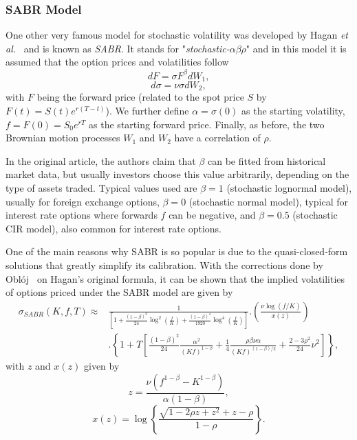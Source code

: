 \subsubsection{SABR Model}
One other very famous model for stochastic volatility was developed by Hagan \textit{et al.}~\cite{Hagan} and is known as \emph{SABR}. It stands for "\emph{stochastic-}$\alpha\beta\rho$" and in this model it is assumed that the option prices and volatilities follow
\begin{equation}\label{dF}
dF=\sigma F^\beta dW_1,
\end{equation}
\begin{equation}\label{dsigma}
d\sigma=\nu\sigma dW_2,
\end{equation}
\noindent with $F$ being the forward price (related to the spot price $S$ by $F(t)=S(t)e^{r(T-t)}$).
We further define $\alpha=\sigma(0)$ as the starting volatility, $f=F(0)=S_0e^{rT}$ as the starting forward price. Finally, as before, the two Brownian motion processes $W_1$ and $W_2$ have a correlation of $\rho$.

\iffalse
It should be noted that we are now using the \hl{forward measure}, so in eq.\eqref{dF} we use $F$, the \emph{forward price}, instead of the usual spot price $S$ from eq.  \ref{GBM}. These two quantities are related by $S(t)=e^{-r(T-t)}F(t)$, so we can easily obtain one from the other.
\fi


In the original article, the authors claim that $\beta$ can be fitted from historical market data, but usually investors choose this value arbitrarily, depending on the type of assets traded. Typical values used are $\beta=1$ (stochastic lognormal model), usually for foreign exchange options, $\beta=0$ (stochastic normal model), typical for interest rate options where forwards $f$ can be negative, and $\beta=0.5$ (stochastic CIR model), also common for interest rate options.

One of the main reasons why SABR is so popular is due to the quasi-closed-form solutions that greatly simplify its calibration. With the corrections done by Oblój~\cite{Obloj} on Hagan's original formula, it can be shown that the implied volatilities of options priced under the SABR model are given by
\begin{equation}
\begin{split}
\sigma_{SABR}(K,f,T)\approx&\frac{1}{\displaystyle\left[1+\frac{(1-\beta)^2}{24}\log^2\left(\frac{f}{K}\right)+\frac{(1-\beta)^4}{1920}\log^4\left(\frac{f}{K}\right)\right]}.\left(\frac{\nu\log\left(f/K\right)}{x(z)}\right)\\
&.\left\{1+T\left[\frac{(1-\beta)^2}{24}\frac{\alpha^2}{(Kf)^{1-\beta}}+\frac{1}{4}\frac{\rho\beta\nu\alpha}{(Kf)^{(1-\beta)/2}}+\frac{2-3\rho^2}{24}\nu^2\right]\right\},
\end{split}
\end{equation}
\noindent with $z$ and $x(z)$ given by
\begin{equation}
z=\frac{\nu\left(f^{1-\beta}-K^{1-\beta}\right)}{\alpha(1-\beta)},
\end{equation}
\begin{equation}
x(z)=\log\left\{\frac{\sqrt{1-2\rho z+z^2}+z-\rho}{1-\rho}\right\}.
\end{equation}

